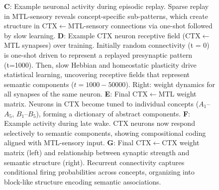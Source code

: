 \documentclass{article}
\begin{document}
\begin{figure}
{\textbf{C}: Example neuronal activity during episodic replay. Sparse replay in MTL-sensory reveals concept-specific sub-patterns, which create structure in CTX$\leftarrow$MTL-sensory connections via one-shot followed by slow learning.
\textbf{D}: Example CTX neuron receptive field (CTX$\leftarrow$MTL synapses) over training. Initially random connectivity (t = 0) is one-shot driven to represent a replayed presynaptic pattern (t=1000). Then, slow Hebbian and homeostatic plasticity drive statistical learning, uncovering receptive fields that represent semantic components ($t = 1000-50000$). Right: weight dynamics for all synapses of the same neuron.  
\textbf{E}: Final CTX$\leftarrow$MTL weight matrix. Neurons in CTX become tuned to individual concepts ($A_1$–$A_5$, $B_1$–$B_5$), forming a dictionary of abstract components.  
\textbf{F}: Example activity during late wake. CTX neurons now respond selectively to semantic components, showing compositional coding aligned with MTL-sensory input.  
\textbf{G}: Final CTX$\leftarrow$CTX weight matrix (left) and relationship between synaptic strength and semantic structure (right). Recurrent connectivity captures conditional firing probabilities across concepts, organizing into block-like structure encoding semantic associations.}
    \label{fig:phase_a}
\end{figure}
\end{document}
